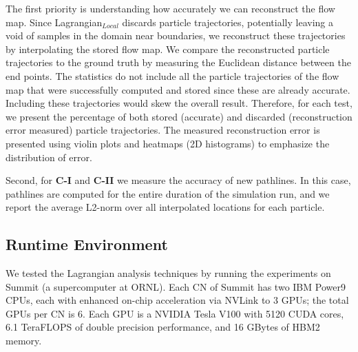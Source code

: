 The first priority is understanding how accurately we can reconstruct the flow map. 
%
Since Lagrangian$_{Local}$ discards particle trajectories, potentially leaving a void of samples in the domain near boundaries, we reconstruct these trajectories by interpolating the stored flow map.
%
We compare the reconstructed particle trajectories to the ground truth by measuring the Euclidean distance between the end points.
%
The statistics do not include all the particle trajectories of the flow map that were successfully computed and stored since these are already accurate.
%
Including these trajectories would skew the overall result.
%
Therefore, for each test, we present the percentage of both stored (accurate) and discarded (reconstruction error measured) particle trajectories.
%
The measured reconstruction error is presented using violin plots and heatmaps (2D histograms) to emphasize the distribution of error. 

Second, for \textbf{C-I} and \textbf{C-II} we measure the accuracy of new pathlines.
%
In this case, pathlines are computed for the entire duration of the simulation run, and we report the average L2-norm over all interpolated locations for each particle.
%

%
\subsection{Runtime Environment}
\label{sec:runtime}
We tested the Lagrangian analysis techniques by running the experiments on Summit (a supercomputer at ORNL).
%
Each CN of Summit has two IBM Power9 CPUs,
%
each with enhanced on-chip acceleration via NVLink to 3 GPUs; the total GPUs per CN is 6.
%
Each GPU is a NVIDIA Tesla V100 with 5120 CUDA cores, 6.1 TeraFLOPS of double precision performance, and 16 GBytes of HBM2 memory.
